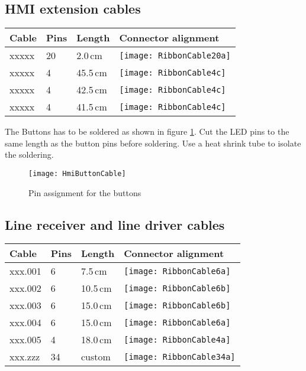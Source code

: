 \subsection{HMI extension cables}
\label{sec:hmiExtensionCables}

\begin{tabular}{m{2cm} m{2cm} m{2cm} m{5cm}}
Cable & Pins & Length & Connector alignment\\
\hline
xxxxx & 20 & 2.0\,cm          & \texttt{[image: RibbonCable20a]} \\
\hline
xxxxx & 4  & 45.5\,cm         & \texttt{[image: RibbonCable4c]} \\
\hline
xxxxx & 4  & 42.5\,cm         & \texttt{[image: RibbonCable4c]} \\
\hline
xxxxx & 4  & 41.5\,cm         & \texttt{[image: RibbonCable4c]} \\
\hline
\end{tabular}

The Buttons has to be soldered as shown in figure \ref{fig:HmiButtonCable}. Cut the LED pins to the same length as the button pins before soldering. Use a heat shrink tube to isolate the soldering.

\begin{figure}[htbp]
	\centering
	\texttt{[image: HmiButtonCable]}
	\caption{Pin assignment for the buttons}
	\label{fig:HmiButtonCable}
\end{figure}

\subsection{Line receiver and line driver cables}

\begin{tabular}{m{2cm} m{2cm} m{2cm} m{5cm}}
Cable & Pins & Length & Connector alignment\\
\hline
xxx.001 & 6 & 7.5\,cm & \texttt{[image: RibbonCable6a]} \\
\hline
xxx.002 & 6 & 10.5\,cm & \texttt{[image: RibbonCable6b]} \\
\hline
xxx.003 & 6 & 15.0\,cm & \texttt{[image: RibbonCable6b]} \\
\hline
xxx.004 & 6 & 15.0\,cm & \texttt{[image: RibbonCable6a]} \\
\hline
xxx.005 & 4 & 18.0\,cm & \texttt{[image: RibbonCable4a]} \\
\hline
xxx.zzz & 34 & custom & \texttt{[image: RibbonCable34a]} \\
\hline
\end{tabular}


